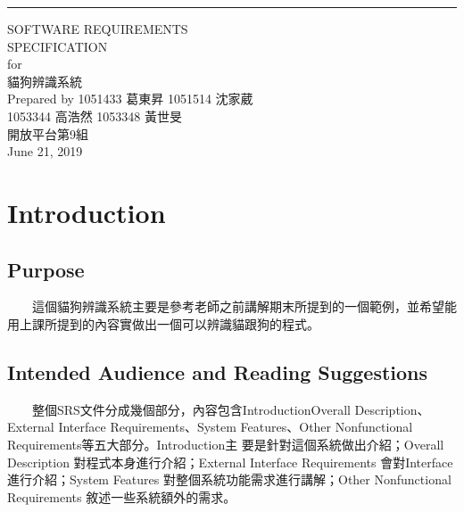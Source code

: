 \documentclass{scrreprt}
\date{}
\begin{document}
\begin{CJK*}{UTF8}{bsmi}
\begin{flushright}
    \rule{16cm}{5pt}\vskip1cm
    \begin{bfseries}
        \Huge{SOFTWARE REQUIREMENTS \\SPECIFICATION}\\
        \vspace{1.9cm}
        for\\
        \vspace{1.9cm}
        貓狗辨識系統\\
        \vspace{1.9cm}
        \Large {Prepared by 1051433 葛東昇 1051514 沈家葳\\1053344 高浩然 1053348 黃世旻}\\
        \vspace{3.8cm}
        開放平台第9組\\
        \vspace{1.9cm}
        June 21, 2019\\
    \end{bfseries}
\end{flushright}

\tableofcontents



\chapter{Introduction}

\section{Purpose}
　　這個貓狗辨識系統主要是參考老師之前講解期末所提到的一個範例，並希望能用上課所提到的內容實做出一個可以辨識貓跟狗的程式。


\section{Intended Audience and Reading Suggestions }
　　整個SRS文件分成幾個部分，內容包含IntroductionOverall Description、External Interface Requirements、System Features、Other Nonfunctional Requirements等五大部分。Introduction主 要是針對這個系統做出介紹；Overall Description 對程式本身進行介紹；External Interface Requirements 會對Interface進行介紹；System Features 對整個系統功能需求進行講解；Other Nonfunctional Requirements 敘述一些系統額外的需求。

\end{CJK*}
\end{document}
